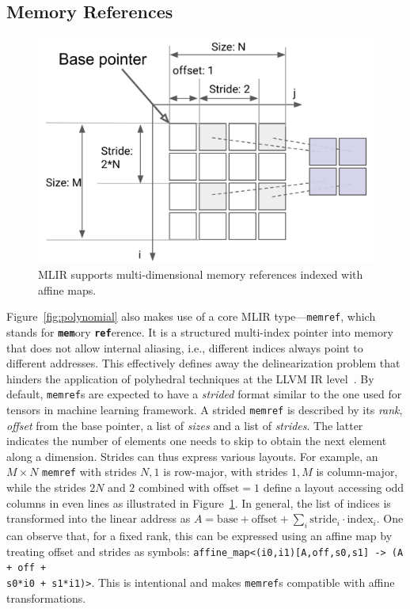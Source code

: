 \documentclass[sigplan]{acmart}
\newcommand{\icode}[1]{{\texttt {#1}}}
\newcommand{\memref}{\icode{memref}\xspace}
\begin{document}
\subsection{Memory References}\label{sec:memref}

\begin{figure}
    \centering
    \includegraphics[width=0.7\columnwidth]{images/memref.png}
    \vspace{-.5cm}
    \caption{MLIR supports multi-dimensional memory references indexed with affine maps.}
    \label{fig:memref}
\end{figure}

Figure~\ref{fig:polynomial} also makes use of a core MLIR type---\memref, which stands for \textbf{\texttt{mem}}ory \textbf{\texttt{ref}}erence.
It is a structured multi-index pointer into memory that does not allow internal aliasing, i.e., different indices always point to different addresses.
This effectively defines away the delinearization problem that hinders the application of polyhedral techniques at the LLVM IR level~\cite{delinearization}.
By default, {\memref}s are expected to have a \emph{strided} format similar to the one used for tensors in machine learning framework.
A strided \memref is described by its \emph{rank}, \emph{offset} from the base pointer, a list of \emph{sizes} and a list of \emph{strides}.
The latter indicates the number of elements one needs to skip to obtain the next element along a dimension.
Strides can thus express various layouts.
For example, an $M \times N$ \memref with strides $N, 1$ is row-major, with strides $1, M$ is column-major, while the strides $2N$ and $2$ combined with $\mathrm{offset}=1$ define a layout accessing odd columns in even lines as illustrated in Figure~\ref{fig:memref}.
In general, the list of indices is transformed into the linear address as 
$A = \mathrm{base} + \mathrm{offset} + \sum_i \mathrm{stride}_i \cdot \mathrm{index}_i.$
One can observe that, for a fixed rank, this can be expressed using an affine map by treating offset and strides as symbols:
\icode{affine\_map<(i0,i1)[A,off,s0,s1] -> (A + off + \\ s0*i0 + s1*i1)>}.
This is intentional and makes {\memref}s compatible with affine transformations.
\end{document}
